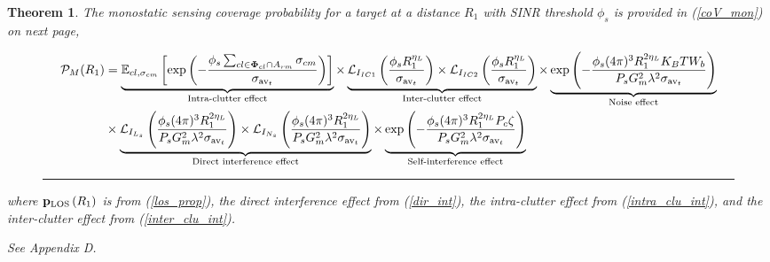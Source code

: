\documentclass[journal]{IEEEtran}
\newtheorem{theorem}{\textbf{Theorem}}
\begin{document}
\begin{theorem} \label{mono_det}
The monostatic sensing coverage probability for a target at a distance \(R_1\) with SINR threshold \(\phi_s\) is provided in (\ref{coV_mon}) on next page,
\begin{figure*}[h]
\begin{equation}\label{coV_mon}
\begin{aligned}
 \mathcal{P}_M (R_1) &=  \underbrace{\mathbb{E}_{cl, \sigma_{cm}}\left[ \exp\left( - \frac{\phi_s  \sum_{cl \in \bold\Phi_{cl} \cap A_{rm}} \sigma_{cm}}{\sigma_{\text{av}_t}} \right) \right]}_{\text{Intra-clutter effect}} 
\times \underbrace{\mathcal{L}_{I_{IC1}}\left( \frac{\phi_s  R_1^{\eta_L}}{\sigma_{\text{av}_t}} \right)
\times \mathcal{L}_{I_{IC2}}\left( \frac{\phi_s  R_1^{\eta_L}}{\sigma_{\text{av}_t}} \right)}_{\text{Inter-clutter effect}} 
\times \underbrace{\exp\left( - \frac{\phi_s  (4\pi)^3 R_1^{2 \eta_L} K_B T W_b}{P_s G_m^2 \lambda^2 \sigma_{\text{av}_t}} \right)}_{\text{Noise effect}} \\
&  \times \underbrace{\mathcal{L}_{I_{L_s}}\left( \frac{\phi_s  (4\pi)^3 R_1^{2 \eta_L}}{P_s G_m^2 \lambda^2 \sigma_{\text{av}_t}} \right)
\times \mathcal{L}_{I_{N_s}}\left( \frac{\phi_s  (4\pi)^3 R_1^{2 \eta_L}}{P_s G_m^2 \lambda^2 \sigma_{\text{av}_t}} \right)}_{\text{Direct interference effect}} 
\times \underbrace{\exp\left( - \frac{\phi_s  (4\pi)^3 R_1^{2 \eta_L} P_c \zeta}{P_s G_m^2 \lambda^2 \sigma_{\text{av}_t}} \right)}_{\text{Self-interference effect}}
\end{aligned}
\end{equation}
\hrule
\end{figure*}
where \(\bold{p}_{\text{LOS}}\left(R_1\right)\) is from (\ref{los_prop}), the direct interference effect from (\ref{dir_int}), the intra-clutter effect from (\ref{intra_clu_int}), and the inter-clutter effect from (\ref{inter_clu_int}).
\begin{IEEEproof}
See Appendix D.
\end{IEEEproof}
\end{theorem}
\end{document}
